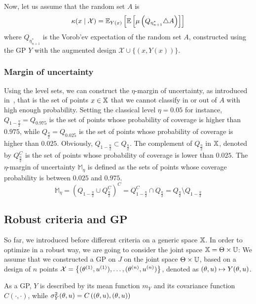 \documentclass[../../Main_ManuscritThese.tex]{subfiles}
\begin{document}
Now, let us assume that the random set $A$ is 
\begin{equation}
  \kappa(x \mid \mathcal{X}) = \mathbb{E}_{Y(x)}\left[\mathbb{E}\left[\mu\left(Q_{\eta^*_{n+1}}  \triangle A\right)\right]\right]
\end{equation}
where $Q_{\eta^*_{n+1}}$ is the Vorob'ev expectation of the random set $A$, constructed using the GP $Y$ with the augmented design $\mathcal{X}\cup\{(x, Y(x))\}$.
\subsubsection{Margin of uncertainty}
\label{sec:margin_of_uncertainty}
Using the level sets, we can construct the $\eta$-margin of uncertainty, as introduced in~\cite{dubourg_reliability-based_2011}, that is the set of points $x \in \mathbb{X}$ that we cannot classify in or out of $A$ with high enough probability.
Setting the classical level $\eta=0.05$ for instance, $Q_{1-\frac{\eta}{2}}=Q_{0.975}$ is the set of points whose probability of coverage is higher than $0.975$, while $Q_{\frac{\eta}{2}}=Q_{0.025}$ is the set of points whose probability of coverage is higher than $0.025$. Obviously, $Q_{1-\frac{\eta}{2}} \subset Q_{\frac{\eta}{2}}$. The complement of $Q_{\frac{\eta}{2}}$ in $\mathbb{X}$, denoted by $Q_{\frac{\eta}{2}}^C$ is the set of points whose probability of coverage is lower than $0.025$. The $\eta$-margin of uncertainty $\mathbb{M}_{\eta}$ is defined as the sets of points whose coverage probability is between $0.025$ and $0.975$.
\begin{equation}
  \label{eq:margin_unc}
  \mathbb{M}_{\eta} = \left(Q_{1-\frac{\eta}{2}} \cup Q^C_{\frac{\eta}{2}} \right)^C = Q_{1-\frac{\eta}{2}}^C \cap Q_{\frac{\eta}{2}} = Q_{\frac{\eta}{2}} \setminus Q_{1-\frac{\eta}{2}}
\end{equation}


\subsection{Robust criteria and GP}
So far, we introduced before different criteria on a generic space $\mathbb{X}$. In order to optimize in a robust way, we are going to consider the joint space $\mathbb{X} = \Theta \times \mathbb{U}$:
We assume that we constructed a GP on $J$ on the joint space $\Theta \times \mathbb{U}$, based on a design of $n$ points $\mathcal{X} = \left\{(\theta^{(1)},u^{(1)}),\dots,(\theta^{(n)},u^{(n)}) \right\}$, denoted as $(\theta,u)\mapsto Y(\theta,u)$.

As a GP, $Y$ is described by its mean function $m_{Y}$ and its covariance function $C(\cdot, \cdot)$, while $\sigma^2_Y(\theta,u) = C\left((\theta,u), (\theta,u)\right)$
\end{document}
